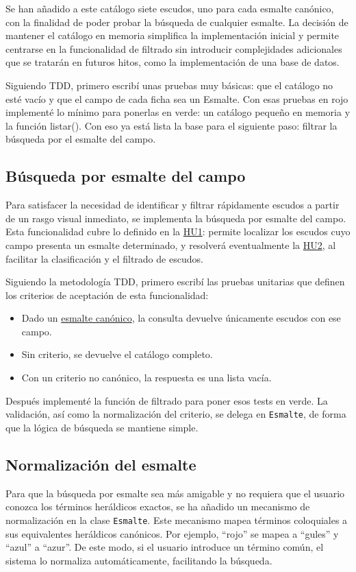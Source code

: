 Se han añadido a este catálogo siete escudos, uno para cada esmalte canónico, con la finalidad de
poder probar la búsqueda de cualquier esmalte. La decisión de mantener el catálogo en memoria
simplifica la implementación inicial y permite centrarse en la funcionalidad de filtrado sin
introducir complejidades adicionales que se tratarán en futuros hitos, como la implementación
de una base de datos.

Siguiendo TDD, primero escribí unas pruebas muy básicas: que el catálogo no esté vacío y que el 
campo de cada ficha sea un Esmalte. Con esas pruebas en rojo implementé lo mínimo para ponerlas en
verde: un catálogo pequeño en memoria y la función listar(). Con eso ya está lista la base para el
siguiente paso: filtrar la búsqueda por el esmalte del campo.

\subsection{Búsqueda por esmalte del campo}
Para satisfacer la necesidad de identificar y filtrar rápidamente escudos a partir de un rasgo visual
inmediato, se implementa la búsqueda por esmalte del campo. Esta funcionalidad cubre lo definido en la
\hyperref[sec:hu1]{HU1}: permite localizar los escudos cuyo campo presenta un esmalte determinado, y
resolverá eventualmente la \hyperref[sec:hu2]{HU2}, al facilitar la clasificación y el filtrado de escudos.

Siguiendo la metodología TDD, primero escribí las pruebas unitarias que definen los criterios de
aceptación de esta funcionalidad:

\begin{itemize}
    \item Dado un \hyperref[fig:esmaltes]{esmalte canónico}, la consulta devuelve únicamente escudos con ese campo.
    \item Sin criterio, se devuelve el catálogo completo.
    \item Con un criterio no canónico, la respuesta es una lista vacía.
\end{itemize}

Después implementé la función de filtrado para poner esos tests en verde. La validación, así como 
la normalización del criterio, se delega en \texttt{Esmalte}, de forma que la lógica de
búsqueda se mantiene simple.

\subsection{Normalización del esmalte}
Para que la búsqueda por esmalte sea más amigable y no requiera que el usuario conozca los términos
heráldicos exactos, se ha añadido un mecanismo de normalización en la clase \texttt{Esmalte}. 
Este mecanismo mapea términos coloquiales a sus equivalentes heráldicos canónicos. Por ejemplo,
``rojo'' se mapea a ``gules'' y ``azul'' a ``azur''. De este modo, si el usuario introduce un término común,
el sistema lo normaliza automáticamente, facilitando la búsqueda.

